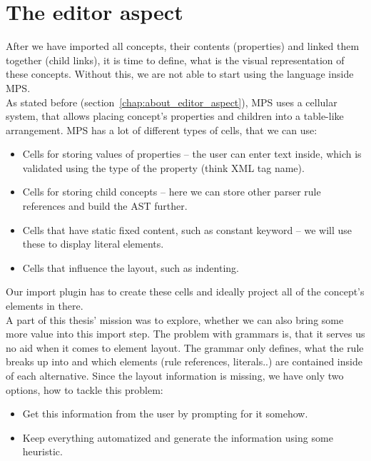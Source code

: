 \section{The editor aspect}
\label{chap:editor_aspect}

After we have imported all concepts, their contents (properties) and linked them together (child links), it is time to define, what is the visual representation of these concepts.
Without this, we are not able to start using the language inside MPS.
\\

As stated before (section~\ref{chap:about_editor_aspect}), MPS uses a cellular system, that allows placing concept's properties and children into a table-like arrangement.
MPS has a lot of different types of cells, that we can use:

\begin{itemize}
	\item Cells for storing values of properties -- the user can enter text inside, which is validated using the type of the property (think XML tag name).

	\item Cells for storing child concepts -- here we can store other parser rule references and build the AST further.

	\item Cells that have static fixed content, such as constant keyword -- we will use these to display literal elements.

	\item Cells that influence the layout, such as indenting.
\end{itemize}

Our import plugin has to create these cells and ideally project all of the concept's elements in there.
\\

A part of this thesis' mission was to explore, whether we can also bring some more value into this import step.
The problem with grammars is, that it serves us no aid when it comes to element layout.
The grammar only defines, what the rule breaks up into and which elements (rule references, literals..) are contained inside of each alternative.
Since the layout information is missing, we have only two options, how to tackle this problem:

\begin{itemize}
	\item Get this information from the user by prompting for it somehow.
	\item Keep everything automatized and generate the information using some heuristic.
\end{itemize}

